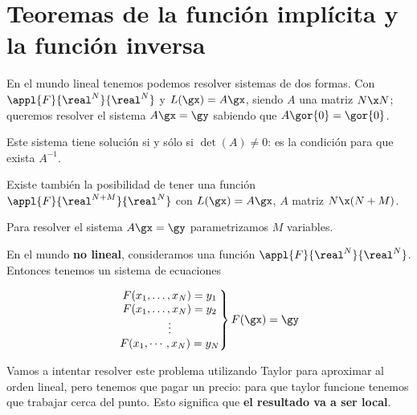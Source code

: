 \section{Teoremas de la función implícita y la función inversa}

En el mundo lineal tenemos podemos resolver sistemas de dos formas. Con $\appl{F}{\real^N}{\real^N}$ y $L(\gx) = A\gx$, siendo $A$ una matriz $N\x N$; queremos resolver el sistema $A\gx = \gy$ sabiendo que $A\gor{0} = \gor{0}$.

Este sistema tiene solución si y sólo si  $\det(A) \neq 0$: es la condición para que exista $A^{-1}$.

Existe también la posibilidad de tener una función $\appl{F}{\real^{N+M}}{\real^N}$ con $L(\gx) = A\gx$, $A$ matriz $N\x (N+M)$.

Para resolver el sistema $A\gx = \gy$ parametrizamos $M$ variables.

En el mundo \textbf{no lineal}, consideramos una función $\appl{F}{\real^N}{\real^N}$. Entonces tenemos un sistema de ecuaciones

\[ \left.\begin{matrix}
F(x_1,\dotsc,x_N) = y_1\\
F(x_1,\dotsc,x_N) = y_2\\
\vdots\\
F(x_1,\cdots,x_N) = y_N          
        \end{matrix}
\right\} F(\gx)=\gy \]

Vamos a intentar resolver este problema utilizando Taylor para aproximar al orden lineal, pero tenemos que pagar un precio: para que taylor funcione tenemos que trabajar cerca del punto. Esto significa que \textbf{el resultado va a ser local}.


